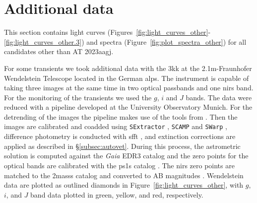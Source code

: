 \documentclass[twocolumn]{aastex631}
\begin{document}
% 

\appendix

\section{Additional data}
\label{app:additonaldata}

This section contains light curves (Figures~\ref{fig:light_curves_other}-\ref{fig:light_curves_other.3}) and spectra (Figure~\ref{fig:plot_spectra_other}) for all candidates other than AT 2023aagj.

For some transients we took additional data with the \gls{3kk} \citep{2016SPIE.9908E..44L} at the 2.1m-Fraunhofer Wendelstein Telescope \citep{2014SPIE.9145E..2DH} located in the German alps.
The instrument is capable of taking three images at the same time in two optical passbands and one \glspl{nir} band.
For the monitoring of the transients we used the $g$, $i$ and $J$ bands.
The data were reduced with a pipeline developed at the University Observatory Munich.
For the detrending of the images the pipeline makes use of the tools from \cite{2002A&A...381.1095G}.
Then the images are calibrated and coadded using \texttt{SExtractor} \citep{1996A&AS..117..393B}, \texttt{SCAMP} \citep{2006ASPC..351..112B} and \texttt{SWarp} \citep{2002ASPC..281..228B}, difference photometry is conducted with \gls{sfft} \citep{huImageSubtractionFourier2022}, and extinction corrections are applied as described in \S\ref{subsec:autovet}.
During this process, the astrometric solution is computed against the \textit{Gaia} EDR3 catalog \citep{gaiacollaborationGaiaMission2016, 2021A&A...649A...1G} and the zero points for the optical bands are calibrated with the \glspl{ps1} catalog \citep{2013ApJS..205...20M}.
The \glspl{nir} zero points are matched to the \glspl{2mass} catalog \citep{2006AJ....131.1163S} and converted to AB magnitudes \citep{2007AJ....133..734B}.
Wendelstein data are plotted as outlined diamonds in Figure~\ref{fig:light_curves_other}, with $g$, $i$, and $J$ band data plotted in green, yellow, and red, respectively.







\end{document}
